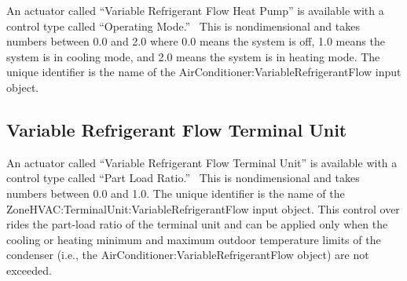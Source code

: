 An actuator called ``Variable Refrigerant Flow Heat Pump'' is available with a control type called ``Operating Mode.''~ This is nondimensional and takes numbers between 0.0 and 2.0 where 0.0 means the system is off, 1.0 means the system is in cooling mode, and 2.0 means the system is in heating mode. The unique identifier is the name of the AirConditioner:VariableRefrigerantFlow input object.

\subsection{Variable Refrigerant Flow Terminal Unit}\label{variable-refrigerant-flow-terminal-unit}

An actuator called ``Variable Refrigerant Flow Terminal Unit'' is available with a control type called ``Part Load Ratio.''~ This is nondimensional and takes numbers between 0.0 and 1.0. The unique identifier is the name of the ZoneHVAC:TerminalUnit:VariableRefrigerantFlow input object. This control over rides the part-load ratio of the terminal unit and can be applied only when the cooling or heating minimum and maximum outdoor temperature limits of the condenser (i.e., the AirConditioner:VariableRefrigerantFlow object) are not exceeded.
